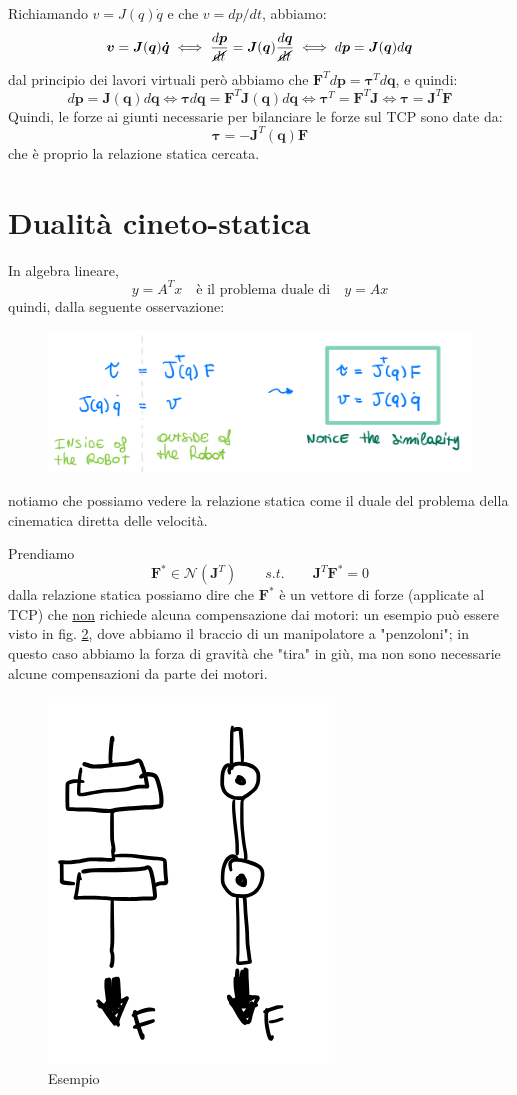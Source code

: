 Richiamando $v=J(q)\dot{q}$ e che $v = dp/dt$, abbiamo:
$$
\bm{v} = \bm{J}(\bm{q})\bm{\dot{q}}
\iff
\frac{d\bm{p}}{\cancel{dt}} = \bm{J}(\bm{q}) \frac{d\bm{q}}{\cancel{dt}}
\iff
d\bm{p} = \bm{J}(\bm{q}) d\bm{q}
$$
dal principio dei lavori virtuali però abbiamo che  $\bm{F}^Td\bm{p} = \bm{\tau}^Td \bm{q}$, e quindi:
$$
d\bm{p} = \bm{J}(\bm{q}) d\bm{q}
\iff
\bm{\tau}d\bm{q} = \bm{F}^T\bm{J}(\bm{q})d\bm{q}
\iff
\bm{\tau}^T = \bm{F}^T\bm{J}
\iff
\bm{\tau} = \bm{J}^T\bm{F}
$$
Quindi, le forze ai giunti necessarie per bilanciare le forze sul TCP sono date da:
\begin{equation}\label{eq:static_equivalence}
\boxed{
\bm{\tau} = -\bm{J}^T(\bm{q})\bm{F}
}
\end{equation}
che è proprio la relazione statica cercata.




\section{Dualità cineto-statica}
In algebra lineare, 
$$
y = A^Tx \quad \text{è il problema duale di} \quad y = Ax
$$
quindi, dalla seguente osservazione:
\begin{figure}[H]
	\centering
	\includegraphics[width=0.7\linewidth]{images/statics_3}
	\label{fig:statics3}
\end{figure}
notiamo che possiamo vedere la relazione statica come il duale del problema della cinematica diretta delle velocità.

Prendiamo 
$$
\bm{F}^* \in \mathcal{N}(\bm{J}^T) \qquad s.t. \qquad \bm{J}^T\bm{F}^* = 0
$$
dalla relazione statica possiamo dire che $\bm{F}^*$ è un vettore di forze (applicate al TCP) che \underline{non} richiede alcuna compensazione dai motori: un esempio può essere visto in fig. \ref{fig:statics4}, dove abbiamo il braccio di un manipolatore a "penzoloni"; in questo caso abbiamo la forza di gravità che "tira" in giù, ma non sono necessarie alcune compensazioni da parte dei motori.
\begin{figure}[H]
	\centering
	\includegraphics[width=0.2\linewidth]{images/statics_4}
	\caption{Esempio}
	\label{fig:statics4}
\end{figure}


